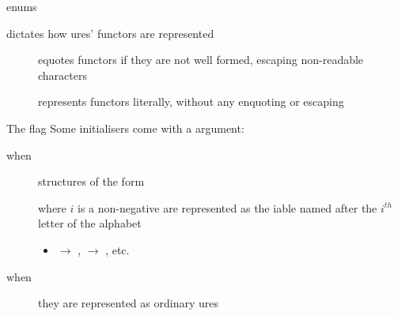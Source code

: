 \documentclass[handout]{beamer}
\begin{document}
\begin{frame}[allowframebreaks]{ enums}
    \begin{block}{ dictates how ures' functors are represented}
        \begin{description}
            \item[] equotes functors if they are not well formed, escaping non-readable characters
            \item[] represents functors literally, without any enquoting or escaping
        \end{description}
    \end{block}

    \begin{block}{The  flag}
        Some  initialisers come with a  argument:
        \begin{description}
            \item[when ] structures of the form
            \begin{center}
            \end{center}
            where $i$ is a non-negative  are represented as the iable named after the $i^{th}$ letter of the alphabet
            \begin{itemize}\small
                \item {} $\rightarrow$ ,  $\rightarrow$ , etc.
            \end{itemize}
            \item[when ] they are represented as ordinary ures
        \end{description}
    \end{block}

\end{frame}
\end{document}

